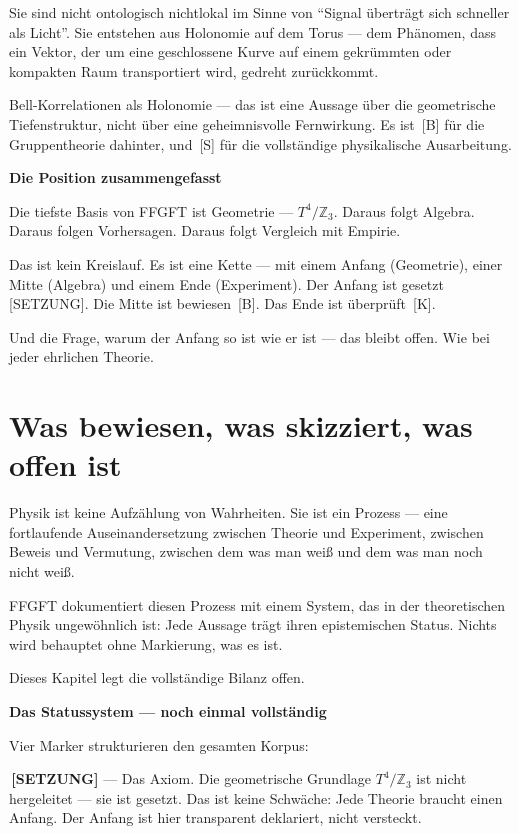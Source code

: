 \documentclass[11pt,oneside]{book}
\newcommand{\status}[1]{\penalty10000\,{\scriptsize\textcolor{gray!60}{[#1]}}}
\begin{document}
Sie sind nicht ontologisch nichtlokal im Sinne von \enquote{Signal überträgt
sich schneller als Licht}. Sie entstehen aus Holonomie auf dem Torus —
dem Phänomen, dass ein Vektor, der um eine geschlossene Kurve auf einem
gekrümmten oder kompakten Raum transportiert wird, gedreht zurückkommt.


Bell-Korrelationen als Holonomie — das ist eine Aussage über die
geometrische Tiefenstruktur, nicht über eine geheimnisvolle Fernwirkung.
Es ist \status{B} für die Gruppentheorie dahinter, und \status{S} für die vollständige
physikalische Ausarbeitung.


\textbf{Die Position zusammengefasst}


Die tiefste Basis von FFGFT ist Geometrie — $T^4/\mathbb{Z}_3$. Daraus folgt Algebra.
Daraus folgen Vorhersagen. Daraus folgt Vergleich mit Empirie.


Das ist kein Kreislauf. Es ist eine Kette — mit einem Anfang (Geometrie),
einer Mitte (Algebra) und einem Ende (Experiment). Der Anfang ist gesetzt
\status{SETZUNG}. Die Mitte ist bewiesen \status{B}. Das Ende ist überprüft \status{K}.


Und die Frage, warum der Anfang so ist wie er ist — das bleibt offen.
Wie bei jeder ehrlichen Theorie.








\chapter{Was bewiesen, was skizziert, was offen ist}

Physik ist keine Aufzählung von Wahrheiten. Sie ist ein Prozess — eine
fortlaufende Auseinandersetzung zwischen Theorie und Experiment, zwischen
Beweis und Vermutung, zwischen dem was man weiß und dem was man noch nicht
weiß.


FFGFT dokumentiert diesen Prozess mit einem System, das in der theoretischen
Physik ungewöhnlich ist: Jede Aussage trägt ihren epistemischen Status.
Nichts wird behauptet ohne Markierung, was es ist.


Dieses Kapitel legt die vollständige Bilanz offen.


\textbf{Das Statussystem — noch einmal vollständig}


Vier Marker strukturieren den gesamten Korpus:


\textbf{\status{SETZUNG}} — Das Axiom. Die geometrische Grundlage $T^4/\mathbb{Z}_3$ ist nicht
hergeleitet — sie ist gesetzt. Das ist keine Schwäche: Jede Theorie
braucht einen Anfang. Der Anfang ist hier transparent deklariert, nicht
versteckt.
\end{document}
